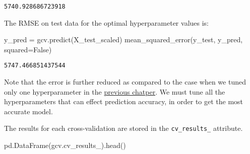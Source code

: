 \documentclass[
  letterpaper,
  DIV=11,
  numbers=noendperiod]{scrreprt}
\newenvironment{Shaded}{\begin{snugshade}}{\end{snugshade}}
\newcommand{\NormalTok}[1]{\textcolor[rgb]{0.00,0.23,0.31}{#1}}
\newcommand{\OperatorTok}[1]{\textcolor[rgb]{0.37,0.37,0.37}{#1}}
\newcommand{\VariableTok}[1]{\textcolor[rgb]{0.07,0.07,0.07}{#1}}
\begin{document}
\begin{verbatim}
5740.928686723918
\end{verbatim}

The RMSE on test data for the optimal hyperparameter values is:

\begin{Shaded}
\begin{Highlighting}[]
\NormalTok{y\_pred }\OperatorTok{=}\NormalTok{ gcv.predict(X\_test\_scaled)}
\NormalTok{mean\_squared\_error(y\_test, y\_pred, squared}\OperatorTok{=}\VariableTok{False}\NormalTok{)}
\end{Highlighting}
\end{Shaded}

\begin{verbatim}
5747.466851437544
\end{verbatim}

Note that the error is further reduced as compared to the case when we
tuned only one hyperparameter in the
\href{https://nustat.github.io/STAT303-3-class-notes/KNN.html\#repeatedkfold}{previous
chatper}. We must tune all the hyperparameters that can effect
prediction accuracy, in order to get the most accurate model.

The results for each cross-validation are stored in the
\texttt{cv\_results\_} attribute.

\begin{Shaded}
\begin{Highlighting}[]
\NormalTok{pd.DataFrame(gcv.cv\_results\_).head()}
\end{Highlighting}
\end{Shaded}
\end{document}

